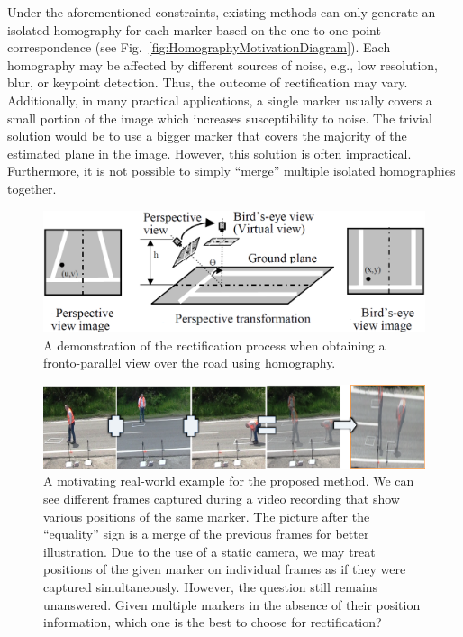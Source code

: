 Under the aforementioned constraints, existing methods can only generate an isolated homography for each marker based on the one-to-one point correspondence (see Fig.~\ref{fig:HomographyMotivationDiagram}). Each homography may be affected by different sources of noise, e.g., low resolution, blur, or keypoint detection. Thus, the outcome of rectification may vary. Additionally, in many practical applications, a single marker usually covers a small portion of the image which increases susceptibility to noise. The trivial solution would be to use a bigger marker that covers the majority of the estimated plane in the image. However, this solution is often impractical. Furthermore, it is not possible to simply ``merge'' multiple isolated homographies together.

\begin{figure}[t]
    \centerline{\includegraphics[width=0.8\linewidth]{figures/methodology/road_rectification.png}}
    \caption[Road rectification]{A demonstration of the rectification process when obtaining a fronto-parallel view over the road using homography. }
    \label{fig:RoadRectification}
\end{figure}

\begin{figure}[t]
    \centerline{\includegraphics[width=\linewidth]{figures/methodology/markers_on_the_road.png}}
    \caption[Multiple markers on the road]{A motivating real-world example for the proposed method. We can see different frames captured during a video recording that show various positions of the same marker. The picture after the ``equality'' sign is a merge of the previous frames for better illustration. Due to the use of a static camera, we may treat positions of the given marker on individual frames as if they were captured simultaneously. However, the question still remains unanswered. Given multiple markers in the absence of their position information, which one is the best to choose for rectification?}
    \label{fig:MultipleMarkersOnRoad}
\end{figure}

